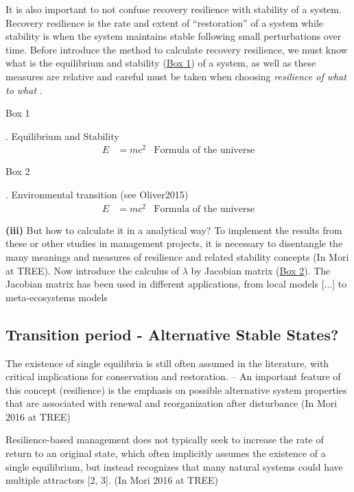 It is also important to not confuse recovery resilience with stability of a system.
Recovery resilience is the rate and extent of ``restoration'' of a system while stability is when the system maintains stable following small perturbations over time.
Before introduce the method to calculate recovery resilience, we must know what is the equilibrium and stability (\hyperlink{box1}{Box 1}) of a system, as well as these measures are relative and careful must be taken when choosing \textit{resilience of what to what} \citep{Carpenter2001}.

\begin{tcolorbox}
\hypertarget{box1}{Box 1}. Equilibrium and Stability
\begin{align}
E &= mc^2 & \text{Formula of the universe}
\end{align}
\end{tcolorbox}

\begin{tcolorbox}
\hypertarget{box2}{Box 2}. Environmental transition (see Oliver2015)
\begin{align}
E &= mc^2 & \text{Formula of the universe}
\end{align}
\end{tcolorbox}

\textbf{(iii)} But how to calculate it in a analytical way?
To implement the results from these or other studies in management projects, it is necessary to disentangle the many meanings and measures of resilience and related stability concepts (In Mori at TREE).
Now introduce the calculus of $\lambda$ by Jacobian matrix (\hyperlink{box2}{Box 2}).
The Jacobian matrix has been used in different applications, from local models [...] to meta-ecosystems models \citep{Gravel2016}

\subsection{Transition period - Alternative Stable States?}
The existence of single equilibria is still often assumed in the literature, with critical implications for conservation and restoration. -- An important feature of this concept (resilience) is the emphasis on possible alternative system properties that are associated with renewal and reorganization after disturbance (In Mori 2016 at TREE)

Resilience-based management does not typically seek to increase the rate of return to an original state, which often implicitly assumes the existence of a single equilibrium, but instead recognizes that many natural systems could have multiple attractors [2, 3]. (In Mori 2016 at TREE)

